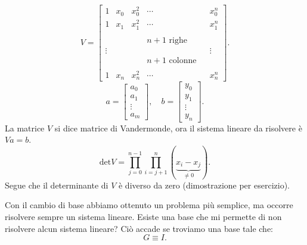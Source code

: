 \[
V = \left[
\begin{array}{cccccc}
1 & x_0 & x_0^2 & \cdots & & x_0^n \\
1 & x_1 & x_1^2 & \cdots & & x_1^n \\
\\
& & & n+1 \textrm{ righe} & &\\
\vdots & & & & & \vdots \\
& & & n+1 \textrm{ colonne} & &\\
\\
1 & x_n &x_n^2 & \cdots & & x_n^n
\end{array}\right].
\]
\[ a =
\left[\begin{array}{c}
a_0 \\
a_1 \\
\vdots \\
a_m
\end{array}\right], \quad b =
\left[\begin{array}{c}
y_0 \\
y_1 \\
\vdots \\
y_n
\end{array}\right].
\]
La matrice $V$ si dice matrice di Vandermonde, ora il sistema lineare da
risolvere è $Va = b$.
\[
\textrm{det}V = \prod_{j=0}^{n-1}\prod_{i=j+1}^{n}(\underbrace{x_i-x_j}_{\neq 0}).
\]
Segue che il determinante di $V$ è diverso da zero (dimostrazione per
esercizio).

Con il cambio di base abbiamo ottenuto un problema più semplice, ma occorre
risolvere sempre un sistema lineare. Esiste una base che mi permette di
non risolvere alcun sistema lineare? Ciò accade se troviamo una base tale che:
\[G \equiv I.\]

